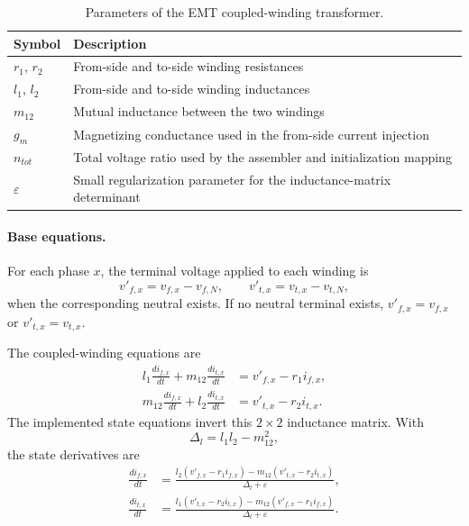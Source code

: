 \begin{table}[H]
    \centering
    \caption{Parameters of the EMT coupled-winding transformer.}
    \begin{tabular}{ll}
        \toprule
        Symbol & Description \\
        \midrule
        $r_1$, $r_2$ & From-side and to-side winding resistances \\
        $l_1$, $l_2$ & From-side and to-side winding inductances \\
        $m_{12}$ & Mutual inductance between the two windings \\
        $g_m$ & Magnetizing conductance used in the from-side current injection \\
        $n_{tot}$ & Total voltage ratio used by the assembler and initialization mapping \\
        $\varepsilon$ & Small regularization parameter for the inductance-matrix determinant \\
        \bottomrule
    \end{tabular}
\end{table}

\paragraph{Base equations.}
For each phase $x$, the terminal voltage applied to each winding is
\begin{equation}
    v'_{f,x}=v_{f,x}-v_{f,N}, \qquad v'_{t,x}=v_{t,x}-v_{t,N},
\end{equation}
when the corresponding neutral exists. If no neutral terminal exists, $v'_{f,x}=v_{f,x}$ or $v'_{t,x}=v_{t,x}$.

The coupled-winding equations are
\begin{align}
    l_1\frac{d i_{f,x}}{dt}+m_{12}\frac{d i_{t,x}}{dt} &= v'_{f,x}-r_1 i_{f,x}, \\
    m_{12}\frac{d i_{f,x}}{dt}+l_2\frac{d i_{t,x}}{dt} &= v'_{t,x}-r_2 i_{t,x}.
\end{align}
The implemented state equations invert this $2\times2$ inductance matrix. With
\begin{equation}
    \Delta_l = l_1l_2-m_{12}^2,
\end{equation}
the state derivatives are
\begin{align}
    \frac{d i_{f,x}}{dt} &= \frac{l_2\left(v'_{f,x}-r_1i_{f,x}\right)-m_{12}\left(v'_{t,x}-r_2i_{t,x}\right)}{\Delta_l+\varepsilon}, \\
    \frac{d i_{t,x}}{dt} &= \frac{l_1\left(v'_{t,x}-r_2i_{t,x}\right)-m_{12}\left(v'_{f,x}-r_1i_{f,x}\right)}{\Delta_l+\varepsilon}.
\end{align}

